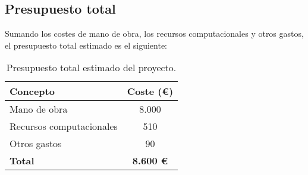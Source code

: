 \subsection{Presupuesto total}\label{subsec:presupuesto-total}
Sumando los costes de mano de obra, los recursos computacionales y otros gastos, el presupuesto total estimado es el
siguiente:

\begin{table}[htp]\label{tab:presupuesto-total}
    \centering
    \begin{tabular}{|l|c|}
        \hline
        \textbf{Concepto} & \textbf{Coste (€)} \\ \hline
        Mano de obra & 8.000 \\
        Recursos computacionales & 510 \\
        Otros gastos & 90 \\ \hline
        \textbf{Total} & \textbf{8.600 €} \\ \hline
    \end{tabular}
    \caption{Presupuesto total estimado del proyecto.}
\end{table}
